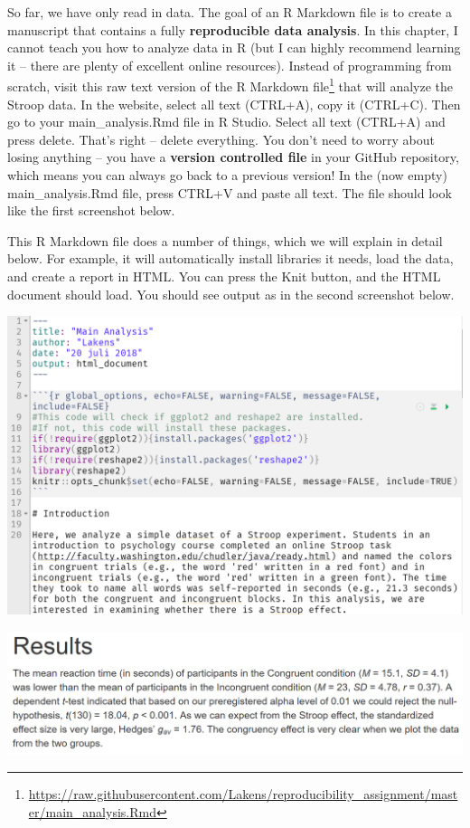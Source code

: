 \documentclass[
  oneside]{krantz}
\renewcommand{\href}[2]{#2\footnote{\url{#1}}}
\begin{document}
So far, we have only read in data. The goal of an R Markdown file is to create a manuscript that contains a fully \textbf{reproducible data analysis}. In this chapter, I cannot teach you how to analyze data in R (but I can highly recommend learning it -- there are plenty of excellent online resources). Instead of programming from scratch, visit \href{https://raw.githubusercontent.com/Lakens/reproducibility_assignment/master/main_analysis.Rmd}{this raw text version of the R Markdown file} that will analyze the Stroop data. In the website, select all text (CTRL+A), copy it (CTRL+C). Then go to your main\_analysis.Rmd file in R Studio. Select all text (CTRL+A) and press delete. That's right -- delete everything. You don't need to worry about losing anything -- you have a \textbf{version controlled file} in your GitHub repository, which means you can always go back to a previous version! In the (now empty) main\_analysis.Rmd file, press CTRL+V and paste all text. The file should look like the first screenshot below.

This R Markdown file does a number of things, which we will explain in detail
below. For example, it will automatically install libraries it needs, load the
data, and create a report in HTML. You can press the Knit button, and the HTML
document should load. You should see output as in the second screenshot below.

\begin{center}\includegraphics[width=1\linewidth]{images/23a19f01f3a23b3673656ee78860caf5} \end{center}

\begin{center}\includegraphics[width=1\linewidth]{images/79166b6bcc909e9e9e7fb0dd365fc8b2} \end{center}
\end{document}
